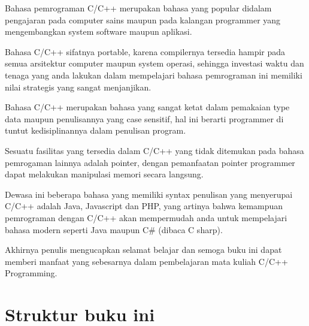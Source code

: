 Bahasa pemrograman C/C++ merupakan bahasa yang popular didalam
pengajaran pada computer sains maupun pada kalangan programmer yang
mengembangkan system software maupun aplikasi.

Bahasa C/C++ sifatnya portable, karena compilernya tersedia hampir pada
semua arsitektur computer maupun system operasi, sehingga investasi
waktu dan tenaga yang anda lakukan dalam mempelajari bahasa pemrograman
ini memiliki nilai strategis yang sangat menjanjikan.

Bahasa C/C++ merupakan bahasa yang sangat ketat dalam pemakaian type
data maupun penulisannya yang case sensitif, hal ini berarti programmer
di tuntut kedisiplinannya dalam penulisan program.

Sesuatu fasilitas yang tersedia dalam C/C++ yang tidak ditemukan pada
bahasa pemrogaman lainnya adalah pointer, dengan pemanfaatan pointer
programmer dapat melakukan manipulasi memori secara langsung.

Dewasa ini beberapa bahasa yang memiliki syntax penulisan yang
menyerupai C/C++ adalah Java, Javascript dan PHP, yang artinya bahwa
kemampuan pemrograman dengan C/C++ akan mempermudah anda untuk
mempelajari bahasa modern seperti Java maupun C\# (dibaca C sharp).

Akhirnya penulis mengucapkan selamat belajar dan semoga buku ini dapat
memberi manfaat yang sebesarnya dalam pembelajaran mata kuliah C/C++
Programming.

\section*{Struktur buku ini}

